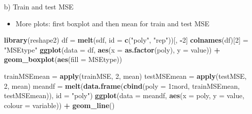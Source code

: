 \documentclass[ignorenonframetext,]{beamer}
\newenvironment{Shaded}{\begin{snugshade}}{\end{snugshade}}
\newcommand{\KeywordTok}[1]{\textcolor[rgb]{0.13,0.29,0.53}{\textbf{#1}}}
\newcommand{\DataTypeTok}[1]{\textcolor[rgb]{0.13,0.29,0.53}{#1}}
\newcommand{\DecValTok}[1]{\textcolor[rgb]{0.00,0.00,0.81}{#1}}
\newcommand{\StringTok}[1]{\textcolor[rgb]{0.31,0.60,0.02}{#1}}
\newcommand{\OperatorTok}[1]{\textcolor[rgb]{0.81,0.36,0.00}{\textbf{#1}}}
\newcommand{\NormalTok}[1]{#1}
\providecommand{\tightlist}{%
  \setlength{\itemsep}{0pt}\setlength{\parskip}{0pt}}
\begin{document}
\begin{frame}[fragile]
\begin{block}{b) Train and test MSE}
\begin{itemize}
\tightlist
\item
  More plots: first boxplot and then mean for train and test MSE
\end{itemize}

\begin{Shaded}
\begin{Highlighting}[]
\KeywordTok{library}\NormalTok{(reshape2)}
\NormalTok{df =}\StringTok{ }\KeywordTok{melt}\NormalTok{(sdf, }\DataTypeTok{id =} \KeywordTok{c}\NormalTok{(}\StringTok{"poly"}\NormalTok{, }\StringTok{"rep"}\NormalTok{))[, }\OperatorTok{-}\DecValTok{2}\NormalTok{]}
\KeywordTok{colnames}\NormalTok{(df)[}\DecValTok{2}\NormalTok{] =}\StringTok{ "MSEtype"}
\KeywordTok{ggplot}\NormalTok{(}\DataTypeTok{data =}\NormalTok{ df, }\KeywordTok{aes}\NormalTok{(}\DataTypeTok{x =} \KeywordTok{as.factor}\NormalTok{(poly), }\DataTypeTok{y =}\NormalTok{ value)) }\OperatorTok{+}\StringTok{ }\KeywordTok{geom_boxplot}\NormalTok{(}\KeywordTok{aes}\NormalTok{(}\DataTypeTok{fill =}\NormalTok{ MSEtype))}
\end{Highlighting}
\end{Shaded}

\begin{Shaded}
\begin{Highlighting}[]
\NormalTok{trainMSEmean =}\StringTok{ }\KeywordTok{apply}\NormalTok{(trainMSE, }\DecValTok{2}\NormalTok{, mean)}
\NormalTok{testMSEmean =}\StringTok{ }\KeywordTok{apply}\NormalTok{(testMSE, }\DecValTok{2}\NormalTok{, mean)}
\NormalTok{meandf =}\StringTok{ }\KeywordTok{melt}\NormalTok{(}\KeywordTok{data.frame}\NormalTok{(}\KeywordTok{cbind}\NormalTok{(}\DataTypeTok{poly =} \DecValTok{1}\OperatorTok{:}\NormalTok{nord, trainMSEmean, testMSEmean)), }
    \DataTypeTok{id =} \StringTok{"poly"}\NormalTok{)}
\KeywordTok{ggplot}\NormalTok{(}\DataTypeTok{data =}\NormalTok{ meandf, }\KeywordTok{aes}\NormalTok{(}\DataTypeTok{x =}\NormalTok{ poly, }\DataTypeTok{y =}\NormalTok{ value, }\DataTypeTok{colour =}\NormalTok{ variable)) }\OperatorTok{+}\StringTok{ }
\StringTok{    }\KeywordTok{geom_line}\NormalTok{()}
\end{Highlighting}
\end{Shaded}

\end{block}

\end{frame}
\end{document}
